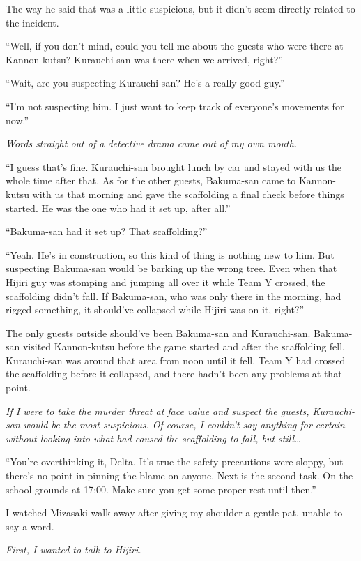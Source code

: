 \documentclass[
    a4paper,
    12pt,
    twoside,
    openany,
    UTF8,
    fontset=windows
]{ctexbook}
\begin{document}
The way he said that was a little suspicious, but it didn't seem directly related to the incident.

``Well, if you don't mind, could you tell me about the guests who were there at Kannon-kutsu? Kurauchi-san was there when we arrived, right?''

``Wait, are you suspecting Kurauchi-san? He's a really good guy.''

``I'm not suspecting him. I just want to keep track of everyone's movements for now.''

\textit{Words straight out of a detective drama came out of my own mouth.}

``I guess that's fine. Kurauchi-san brought lunch by car and stayed with us the whole time after that. As for the other guests, Bakuma-san came to Kannon-kutsu with us that morning and gave the scaffolding a final check before things started. He was the one who had it set up, after all.''

``Bakuma-san had it set up? That scaffolding?''

``Yeah. He's in construction, so this kind of thing is nothing new to him. But suspecting Bakuma-san would be barking up the wrong tree. Even when that Hijiri guy was stomping and jumping all over it while Team Y crossed, the scaffolding didn't fall. If Bakuma-san, who was only there in the morning, had rigged something, it should've collapsed while Hijiri was on it, right?''

The only guests outside should've been Bakuma-san and Kurauchi-san. Bakuma-san visited Kannon-kutsu before the game started and after the scaffolding fell. Kurauchi-san was around that area from noon until it fell. Team Y had crossed the scaffolding before it collapsed, and there hadn't been any problems at that point.

\textit{If I were to take the murder threat at face value and suspect the guests, Kurauchi-san would be the most suspicious. Of course, I couldn't say anything for certain without looking into what had caused the scaffolding to fall, but still\dots}

``You're overthinking it, Delta. It's true the safety precautions were sloppy, but there's no point in pinning the blame on anyone. Next is the second task. On the school grounds at 17:00. Make sure you get some proper rest until then.''

I watched Mizasaki walk away after giving my shoulder a gentle pat, unable to say a word.

\textit{First, I wanted to talk to Hijiri.}
\end{document}
